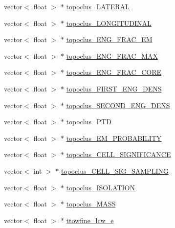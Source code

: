 \begin{DoxyCompactItemize}
\item 
vector$<$ float $>$ $\ast$ \hyperlink{classCollectionTree_a510b268eb8b9ecfe62c6e40544a2fb1c}{topoclus\+\_\+\+L\+A\+T\+E\+R\+AL}
\item 
vector$<$ float $>$ $\ast$ \hyperlink{classCollectionTree_a20132b5dfd49ac9275c6f836395bbb04}{topoclus\+\_\+\+L\+O\+N\+G\+I\+T\+U\+D\+I\+N\+AL}
\item 
vector$<$ float $>$ $\ast$ \hyperlink{classCollectionTree_ae5b114ca03937dc80ff444efdc065d3e}{topoclus\+\_\+\+E\+N\+G\+\_\+\+F\+R\+A\+C\+\_\+\+EM}
\item 
vector$<$ float $>$ $\ast$ \hyperlink{classCollectionTree_a981416faa4ad6e93ab244ef9c481b354}{topoclus\+\_\+\+E\+N\+G\+\_\+\+F\+R\+A\+C\+\_\+\+M\+AX}
\item 
vector$<$ float $>$ $\ast$ \hyperlink{classCollectionTree_ac7aab5cbfedfa9ad902a7a313669eaa8}{topoclus\+\_\+\+E\+N\+G\+\_\+\+F\+R\+A\+C\+\_\+\+C\+O\+RE}
\item 
vector$<$ float $>$ $\ast$ \hyperlink{classCollectionTree_a26363431160366bbfb0ccd2e43eefe06}{topoclus\+\_\+\+F\+I\+R\+S\+T\+\_\+\+E\+N\+G\+\_\+\+D\+E\+NS}
\item 
vector$<$ float $>$ $\ast$ \hyperlink{classCollectionTree_a639791cd8147c7590f95af2f998c6356}{topoclus\+\_\+\+S\+E\+C\+O\+N\+D\+\_\+\+E\+N\+G\+\_\+\+D\+E\+NS}
\item 
vector$<$ float $>$ $\ast$ \hyperlink{classCollectionTree_a9faf1d1515764587207846e9f7872a8e}{topoclus\+\_\+\+P\+TD}
\item 
vector$<$ float $>$ $\ast$ \hyperlink{classCollectionTree_a673ce3b9953312a49d7f0c98595e8b91}{topoclus\+\_\+\+E\+M\+\_\+\+P\+R\+O\+B\+A\+B\+I\+L\+I\+TY}
\item 
vector$<$ float $>$ $\ast$ \hyperlink{classCollectionTree_a71356cd45b3caee11074d46b9a9a0fe1}{topoclus\+\_\+\+C\+E\+L\+L\+\_\+\+S\+I\+G\+N\+I\+F\+I\+C\+A\+N\+CE}
\item 
vector$<$ int $>$ $\ast$ \hyperlink{classCollectionTree_a264a2b4b246f84aa21ab511b1a19a561}{topoclus\+\_\+\+C\+E\+L\+L\+\_\+\+S\+I\+G\+\_\+\+S\+A\+M\+P\+L\+I\+NG}
\item 
vector$<$ float $>$ $\ast$ \hyperlink{classCollectionTree_a5f2dbd8260ce01d3036f42ed785d9446}{topoclus\+\_\+\+I\+S\+O\+L\+A\+T\+I\+ON}
\item 
vector$<$ float $>$ $\ast$ \hyperlink{classCollectionTree_aa0b3d60aa9eabd4df0fa90b5569b7025}{topoclus\+\_\+\+M\+A\+SS}
\item 
vector$<$ float $>$ $\ast$ \hyperlink{classCollectionTree_ae45f962ec473dc14e6e05a757cbd6c4e}{ttowfine\+\_\+lcw\+\_\+e}

\end{DoxyCompactItemize}
